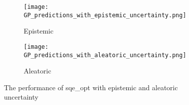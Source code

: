 \begin{figure}
    \centering
    \begin{subfigure}{0.45\textwidth}
        \centering
        \texttt{[image: GP\_predictions\_with\_epistemic\_uncertainty.png]}
        \caption{Epistemic}
        \label{fig:epistemic}
    \end{subfigure}
    \begin{subfigure}{0.45\textwidth}
        \centering
        \texttt{[image: GP\_predictions\_with\_aleatoric\_uncertainty.png]}
        \caption{Aleatoric}
        \label{fig:aleatoric}
    \end{subfigure}
    \caption{The performance of sqe\_opt with epistemic and aleatoric uncertainty}
    \label{fig:uncertainty}
\end{figure}
